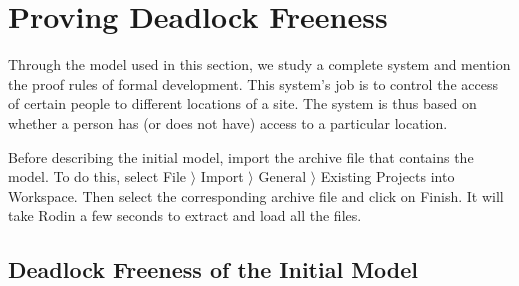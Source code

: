 \clearpage
\section{Proving Deadlock Freeness}
\label{tut_location_access_controller}




Through the model used in this section, we study a complete system and mention the proof rules of formal development. This system's job is to control the access of certain people to different locations of a site. The system is thus based on whether a person has (or does not have) access to a particular location.

Before describing the initial model, import the archive file  that contains the model. To do this, select  \textsf{File $\rangle$ Import $\rangle$ General $\rangle$ Existing Projects into Workspace}. Then select the corresponding archive file and click on \textsf{Finish}. It will take Rodin a few seconds to extract and load all the files.

\subsection{Deadlock Freeness of the Initial Model}
\label{deadlock}
\label{tut_initial_model}



